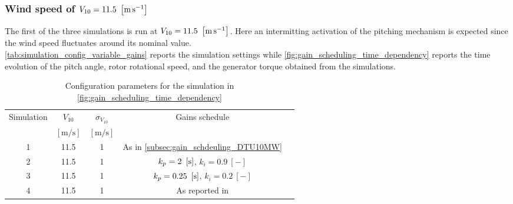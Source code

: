 \subsubsection{Wind speed of  $V_{10} = 11.5 \ \mesunt{\meter\per\second}$}
The first of the three simulations is run at $V_{10} = 11.5 \ \mesunt{\meter\per\second}$. Here an intermitting activation of the pitching mechanism is expected since the wind speed fluctuates around its nominal value.\\
\autoref{tab:simulation_config_variable_gains} reports the simulation settings while \autoref{fig:gain_scheduling_time_dependency} reports the time evolution of the pitch angle, rotor rotational speed, and the generator torque obtained from the simulations. 

\begin{table}[htb]
  \caption{Configuration parameters for the simulation in \autoref{fig:gain_scheduling_time_dependency}}
  \centering
  \begin{tabular}{ccccc}
  \toprule
    Simulation & $V_{10}$  & $\sigma_{V_{10}}$ & Gains schedule \\ 
     & $\left[\si{\meter\per\second}\right]$ & $\left[\si{\meter\per\second}\right]$ & \\ \midrule       
     1 & 11.5 & 1 & As in \autoref{subsec:gain_schdeuling_DTU10MW}  \\
     2 & 11.5 & 1 & $k_p = 2 \ \mesunt{\second}$, $k_i=0.9 \ [-]$ \\
     3 & 11.5 & 1 & $k_p = 0.25 \ \mesunt{\second}$, $k_i=0.2 \ [-]$  \\
     4 & 11.5 & 1 & As reported in \cite{Olimpo_Anaya‐Lara}  \\
     \bottomrule
  \end{tabular}
  \label{tab:simulation_config_variable_gains}
\end{table}

